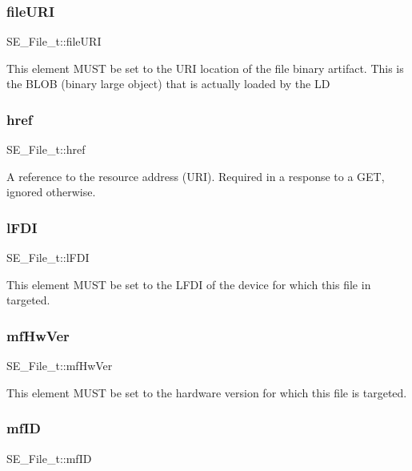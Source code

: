 \subsubsection{\texorpdfstring{file\+U\+RI}{fileURI}}
{\footnotesize\ttfamily S\+E\+\_\+\+File\+\_\+t\+::file\+U\+RI}

This element M\+U\+ST be set to the U\+RI location of the file binary artifact. This is the B\+L\+OB (binary large object) that is actually loaded by the LD \mbox{\label{group__File_ga4f649ba81f3ec3758585c829bffe909e}} 
\subsubsection{\texorpdfstring{href}{href}}
{\footnotesize\ttfamily S\+E\+\_\+\+File\+\_\+t\+::href}

A reference to the resource address (U\+RI). Required in a response to a G\+ET, ignored otherwise. \mbox{\label{group__File_ga74ca6e064ee6671f42955d17470e25b2}} 
\subsubsection{\texorpdfstring{l\+F\+DI}{lFDI}}
{\footnotesize\ttfamily S\+E\+\_\+\+File\+\_\+t\+::l\+F\+DI}

This element M\+U\+ST be set to the L\+F\+DI of the device for which this file in targeted. \mbox{\label{group__File_ga1cd1a18ab1e17b4a045bebf80d68eaeb}} 
\subsubsection{\texorpdfstring{mf\+Hw\+Ver}{mfHwVer}}
{\footnotesize\ttfamily S\+E\+\_\+\+File\+\_\+t\+::mf\+Hw\+Ver}

This element M\+U\+ST be set to the hardware version for which this file is targeted. \mbox{\label{group__File_gadfaca088f863cdcf43485a271a8a481a}} 
\subsubsection{\texorpdfstring{mf\+ID}{mfID}}
{\footnotesize\ttfamily S\+E\+\_\+\+File\+\_\+t\+::mf\+ID}

